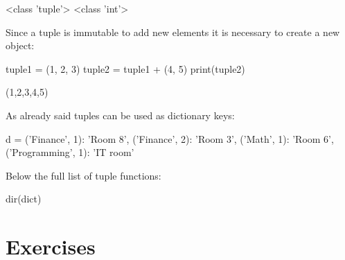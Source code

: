 \begin{ioutput}
<class 'tuple'>
<class 'int'>
\end{ioutput}

Since a tuple is immutable to add new elements it is necessary to create a new object:

\begin{ipythonnon}
tuple1 = (1, 2, 3)
tuple2 = tuple1 + (4, 5)
print(tuple2)
\end{ipythonnon}
\begin{ioutput}
(1,2,3,4,5)
\end{ioutput}

As already said tuples can be used as dictionary keys:

\begin{ipythonnon}
d = {
	('Finance', 1): 'Room 8',
	('Finance', 2): 'Room 3',
	('Math', 1): 'Room 6',
	('Programming', 1): 'IT room'}
\end{ipythonnon}

Below the full list of tuple functions:
\begin{ipythonnon}
dir(dict)
\end{ipythonnon}
\begin{ioutput}
\end{ioutput}

\section*{Exercises}


